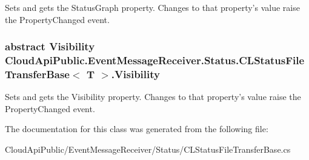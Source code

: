 Sets and gets the Status\-Graph property. Changes to that property's value raise the Property\-Changed event. 

\hypertarget{class_cloud_api_public_1_1_event_message_receiver_1_1_status_1_1_c_l_status_file_transfer_base_3_01_t_01_4_a03be91031e22a9fc794d05391b26f29e}{
\subsubsection[{Visibility}]{\setlength{\rightskip}{0pt plus 5cm}abstract Visibility Cloud\-Api\-Public.\-Event\-Message\-Receiver.\-Status.\-C\-L\-Status\-File\-Transfer\-Base$<$ T $>$.Visibility\hspace{0.3cm}{\ttfamily [get]}}}\label{class_cloud_api_public_1_1_event_message_receiver_1_1_status_1_1_c_l_status_file_transfer_base_3_01_t_01_4_a03be91031e22a9fc794d05391b26f29e}


Sets and gets the Visibility property. Changes to that property's value raise the Property\-Changed event. 



The documentation for this class was generated from the following file\-:\begin{DoxyCompactItemize}
\item 
Cloud\-Api\-Public/\-Event\-Message\-Receiver/\-Status/C\-L\-Status\-File\-Transfer\-Base.\-cs\end{DoxyCompactItemize}
